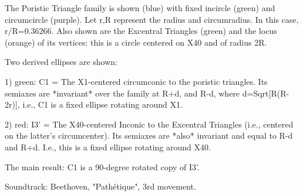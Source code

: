 The Poristic Triangle family is shown (blue) with fixed incircle (green) and circumcircle (purple). Let r,R represent the radius and circumradius. In this case, r/R=0.36266. Also shown are the Excentral Triangles (green) and the locus (orange) of its vertices: this is a circle centered on X40 and of radius 2R.

Two derived ellipses are shown:

1) green: C1 = The X1-centered circumconic to the poristic triangles. Its semiaxes are *invariant* over the family at R+d, and R-d, where d=Sqrt[R(R-2r)], i.e., C1 is a fixed ellipse rotating around X1.

2) red: I3' = The X40-centered Inconic to the Excentral Triangles (i.e., centered on the latter's circumcenter). Its semiaxes are *also* invariant and equal to R-d and R+d. I.e., this is a fixed ellipse rotating around X40.

The main result: C1 is a 90-degree rotated copy of I3'.

Soundtrack: Beethoven, "Pathétique", 3rd movement.